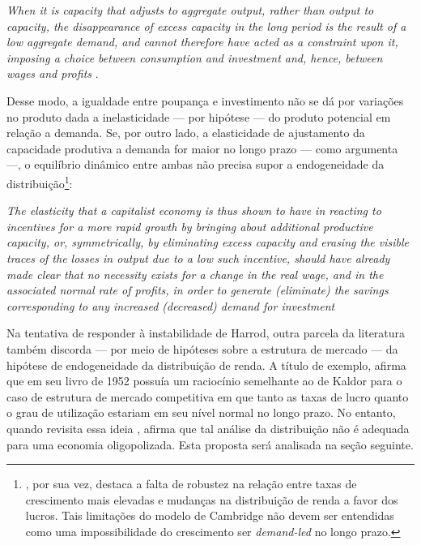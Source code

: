 \begin{citacao}
\textit{When it is
capacity that adjusts to aggregate output, rather than output to
capacity, the disappearance of excess capacity in the long period is
the result of a low aggregate demand, and cannot therefore have
acted as a constraint upon it, imposing a choice between consumption
and investment and, hence, between wages and profits} \cite[p.~50]{halevi_notes_2014}.
\end{citacao}
Desse modo, a igualdade entre poupança e investimento não se dá por variações no produto dada a inelasticidade --- por hipótese --- do produto potencial em relação a demanda.
Se, por outro lado, a elasticidade de ajustamento da capacidade produtiva a demanda for maior no longo prazo --- como argumenta \textcite[p.~62--3]{halevi_notes_2014} ---, o equilíbrio dinâmico entre ambas não precisa supor a endogeneidade da distribuição\footnote{\textcite[p.~158]{cesaratto_neo-kaleckian_2015}, por sua vez, destaca a falta de robustez na relação entre taxas de crescimento mais elevadas e mudanças na distribuição de renda a favor dos lucros.
	Tais limitações do modelo de Cambridge não devem ser entendidas como uma impossibilidade do crescimento ser \textit{demand-led} no longo prazo.}:

\begin{citacao}
	\textit{The elasticity that a capitalist economy is thus shown to have in
	reacting to incentives for a more rapid growth by bringing about
	additional productive capacity, or, symmetrically, by eliminating
	excess capacity and erasing the visible traces of the losses in output
	due to a low such incentive, should have already made clear that no
	necessity exists for a change in the real wage, and in the associated
	normal rate of profits, in order to generate (eliminate) the savings
	corresponding to any increased (decreased) demand for investment} \cite[p.~53]{halevi_notes_2014}
\end{citacao}
 

Na tentativa de responder à instabilidade de Harrod, outra parcela da literatura também discorda --- por meio de hipóteses sobre a estrutura de mercado --- da hipótese de endogeneidade da distribuição de renda.
A título de exemplo, \textcite{steindl_stagnation_1979} afirma que em seu livro de 1952 \cite{steindl_maturity_1952} possuía um raciocínio semelhante ao de Kaldor para o caso de estrutura de mercado competitiva em que tanto as taxas de lucro quanto o grau de utilização estariam em seu nível normal no longo prazo. No entanto, quando revisita essa ideia \cite{steindl_stagnation_1979}, afirma que tal análise da distribuição não é adequada para uma economia oligopolizada. Esta proposta será analisada na seção seguinte.

